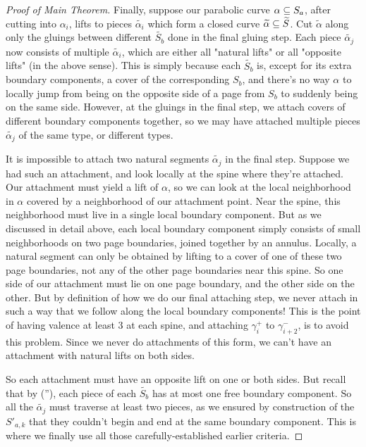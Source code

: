 \begin{proof}[Proof of Main Theorem]
Finally, suppose our parabolic curve $\alpha \subseteq S_a$, after cutting into
$\alpha_i$, lifts to pieces $\widetilde{\alpha_i}$ which form a closed curve $\widetilde{\alpha}
\subseteq \widetilde{S}$.  Cut $\widetilde{\alpha}$ along only the gluings between different
$\widetilde{S_b}$ done in the final gluing step. Each piece $\widetilde{\alpha_j}$ now consists
of multiple $\widetilde{\alpha_i}$, which are either all "natural lifts" or all
"opposite lifts" (in the above sense). This is simply because each $\widetilde{S_b}$
is, except for its extra boundary components, a cover of the corresponding
$S_b$, and there's no way $\alpha$ to locally jump from being on the opposite
side of a page from $S_b$ to suddenly being on the same side. However, at the
gluings in the final step, we attach covers of different boundary components
together, so we may have attached multiple pieces $\widetilde{\alpha_j}$ of the same
type, or different types.

It is impossible to attach two natural segments $\widetilde{\alpha_j}$ in the final
step.  Suppose we had such an attachment, and look locally at the spine where
they're attached. Our attachment must yield a lift of $\alpha$, so we can look
at the local neighborhood in $\alpha$ covered by a neighborhood of our
attachment point.  Near the spine, this neighborhood must live in a single
local boundary component. But as we discussed in detail above, each local
boundary component simply consists of small neighborhoods on two page
boundaries, joined together by an annulus. Locally, a natural segment can only
be obtained by lifting to a cover of one of these two page boundaries, not any
of the other page boundaries near this spine. So one side of our attachment
must lie on one page boundary, and the other side on the other. But by
definition of how we do our final attaching step, we never attach in such a way
that we follow along the local boundary components! This is the point of having
valence at least 3 at each spine, and attaching $\gamma_i^+$ to
$\gamma_{i+2}^-$, is to avoid this problem. Since we never do attachments of
this form, we can't have an attachment with natural lifts on both sides.

So each attachment must have an opposite lift on one or both sides. But recall
that by (\dag''), each piece of each $\widetilde{S_b}$ has at most one free boundary
component. So all the $\widetilde{\alpha_j}$ must traverse at least two pieces, as we
ensured by construction of the $S'_{a,k}$ that they couldn't begin and end at the
same boundary component. This is where we finally use all those
carefully-established earlier criteria.


\end{proof}
